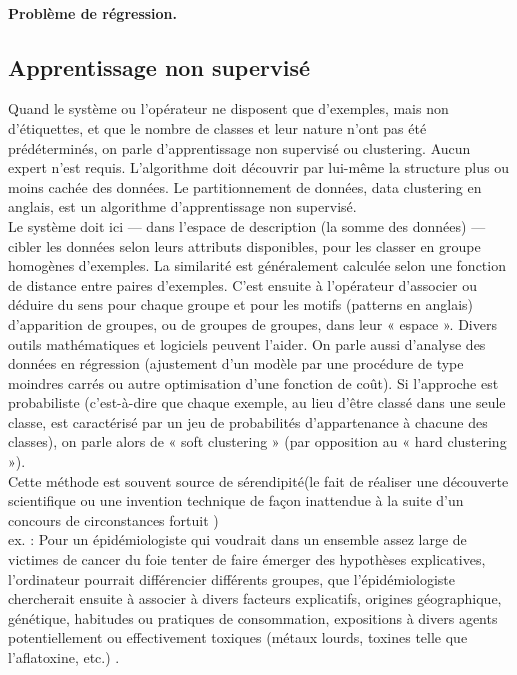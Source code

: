 \documentclass[12pt, french]{report}
\begin{document}
\paragraph{Problème de régression.} 
  








\subsection{Apprentissage non supervisé}
 
Quand le système ou l'opérateur ne disposent que d'exemples, mais non d'étiquettes, et que le nombre de classes et leur nature n'ont pas été prédéterminés, on parle d'apprentissage non supervisé ou clustering. Aucun expert n'est requis. L'algorithme doit découvrir par lui-même la structure plus ou moins cachée des données. Le partitionnement de données, data clustering en anglais, est un algorithme d'apprentissage non supervisé.\\
Le système doit ici — dans l'espace de description (la somme des données) — cibler les données selon leurs attributs disponibles, pour les classer en groupe homogènes d'exemples. La similarité est généralement calculée selon une fonction de distance entre paires d'exemples. C'est ensuite à l'opérateur d'associer ou déduire du sens pour chaque groupe et pour les motifs (patterns en anglais) d'apparition de groupes, ou de groupes de groupes, dans leur « espace ». Divers outils mathématiques et logiciels peuvent l'aider. On parle aussi d'analyse des données en régression (ajustement d'un modèle par une procédure de type moindres carrés ou autre optimisation d'une fonction de coût). Si l'approche est probabiliste (c'est-à-dire que chaque exemple, au lieu d'être classé dans une seule classe, est caractérisé par un jeu de probabilités d'appartenance à chacune des classes), on parle alors de « soft clustering » (par opposition au « hard clustering »).\\
Cette méthode est souvent source de sérendipité(le fait de réaliser une découverte scientifique ou une invention technique de façon inattendue à la suite d'un concours de circonstances fortuit )\\
ex. : Pour un épidémiologiste qui voudrait dans un ensemble assez large de victimes de cancer du foie tenter de faire émerger des hypothèses explicatives, l'ordinateur pourrait différencier différents groupes, que l'épidémiologiste chercherait ensuite à associer à divers facteurs explicatifs, origines géographique, génétique, habitudes ou pratiques de consommation, expositions à divers agents potentiellement ou effectivement toxiques (métaux lourds, toxines telle que l'aflatoxine, etc.) \cite{key13}.
\end{document}
